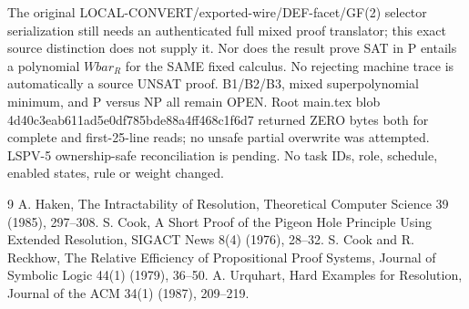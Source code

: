 \documentclass{article}
\begin{document}
The original LOCAL-CONVERT/exported-wire/DEF-facet/GF(2) selector serialization still needs an authenticated full mixed proof translator; this exact source distinction does not supply it. Nor does the result prove SAT in P entails a polynomial $Wbar_R$ for the SAME fixed calculus. No rejecting machine trace is automatically a source UNSAT proof. B1/B2/B3, mixed superpolynomial minimum, and P versus NP all remain OPEN. Root main.tex blob 4d40c3eab611ad5e0df785bde88a4ff468c1f6d7 returned ZERO bytes both for complete and first-25-line reads; no unsafe partial overwrite was attempted. LSPV-5 ownership-safe reconciliation is pending. No task IDs, role, schedule, enabled states, rule or weight changed.

\begin{thebibliography}{9}
 A. Haken, The Intractability of Resolution, Theoretical Computer Science 39 (1985), 297--308.
 S. Cook, A Short Proof of the Pigeon Hole Principle Using Extended Resolution, SIGACT News 8(4) (1976), 28--32.
 S. Cook and R. Reckhow, The Relative Efficiency of Propositional Proof Systems, Journal of Symbolic Logic 44(1) (1979), 36--50.
 A. Urquhart, Hard Examples for Resolution, Journal of the ACM 34(1) (1987), 209--219.
\end{thebibliography}
\end{document}
